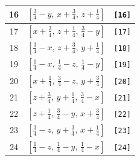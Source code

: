 \documentclass[fleqn,8pt]{jsarticle}
\begin{document}
\begin{longtable}{ccc}
16 & $\left[ \frac{3}{4} - y,\, x + \frac{3}{4},\, z + \frac{1}{4} \right]$ & {\tt [16]} \\ \hline
17 & $\left[ x + \frac{3}{4},\, z + \frac{1}{4},\, \frac{3}{4} - y \right]$ & {\tt [17]} \\ \hline
18 & $\left[ \frac{3}{4} - x,\, z + \frac{3}{4},\, y + \frac{1}{4} \right]$ & {\tt [18]} \\ \hline
19 & $\left[ \frac{1}{4} - x,\, \frac{1}{4} - z,\, \frac{1}{4} - y \right]$ & {\tt [19]} \\ \hline
20 & $\left[ x + \frac{1}{4},\, \frac{3}{4} - z,\, y + \frac{3}{4} \right]$ & {\tt [20]} \\ \hline
21 & $\left[ z + \frac{3}{4},\, y + \frac{1}{4},\, \frac{3}{4} - x \right]$ & {\tt [21]} \\ \hline
22 & $\left[ z + \frac{1}{4},\, \frac{3}{4} - y,\, x + \frac{3}{4} \right]$ & {\tt [22]} \\ \hline
23 & $\left[ \frac{3}{4} - z,\, y + \frac{3}{4},\, x + \frac{1}{4} \right]$ & {\tt [23]} \\ \hline
24 & $\left[ \frac{1}{4} - z,\, \frac{1}{4} - y,\, \frac{1}{4} - x \right]$ & {\tt [24]} \\
\end{longtable}
\end{document}

